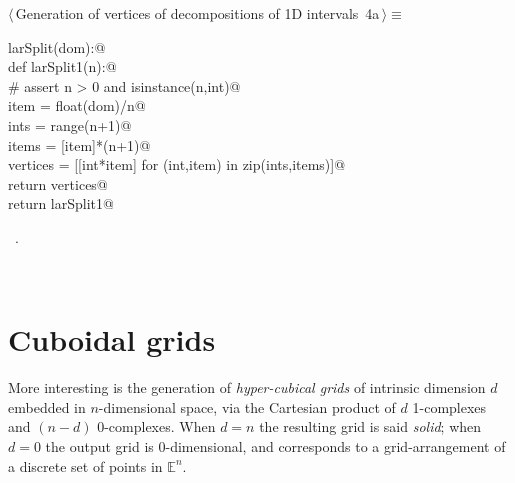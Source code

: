 \documentclass[11pt,oneside]{article}	%
\def\E{\mathbb{E}}
\begin{document}
\begin{flushleft} \small
\begin{minipage}{\linewidth} \label{scrap4}
\protect{}$\langle\,$Generation of vertices of decompositions of 1D intervals\nobreak\ {\footnotesize 4a}$\,\rangle\equiv$
\vspace{-1ex}
\begin{list}{}{} \item
\mbox{}\verb@def larSplit(dom):@\\
\mbox{}\verb@    def larSplit1(n):@\\
\mbox{}\verb@        # assert n > 0 and isinstance(n,int)@\\
\mbox{}\verb@        item = float(dom)/n@\\
\mbox{}\verb@        ints = range(n+1)@\\
\mbox{}\verb@        items = [item]*(n+1)@\\
\mbox{}\verb@        vertices = [[int*item] for (int,item) in zip(ints,items)]@\\
\mbox{}\verb@        return vertices@\\
\mbox{}\verb@    return larSplit1@\\
\mbox{}\verb@@{\NWsep}
\end{list}
\vspace{-1ex}
\footnotesize\addtolength{\baselineskip}{-1ex}
\begin{list}{}{\setlength{\itemsep}{-\parsep}\setlength{\itemindent}{-\leftmargin}}
\item \NWtxtMacroRefIn\ .
\end{list}
\end{minipage}\\[4ex]
\end{flushleft}


\section{Cuboidal grids}
\label{sec:cuboids}

More interesting is the generation of \emph{hyper-cubical grids} of intrinsic dimension $d$ embedded in $n$-dimensional space, via the Cartesian product of $d$ 1-complexes and $(n-d)$ 0-complexes. When $d=n$ the resulting grid is said \emph{solid}; when $d=0$ the output grid is 0-dimensional, and corresponds to a grid-arrangement of a discrete set of points in $\E^n$.
\end{document}
